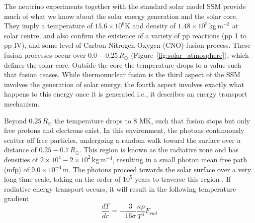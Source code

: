 The neutrino experiments together with the standard solar model SSM provide much of what we know about the solar energy generation and the solar core. They imply a temperature of $15.6\times10^6$K and density of $1.48\times10^5$\,kg\,m$^{-3}$ at solar centre, and also confirm the existence of a variety of pp reactions (pp 1 to pp IV), and some level of Carbon-Nitrogen-Oxygen (CNO) fusion process. These fusion processes occur over $0.0-0.25\,R_{\odot}$ (Figure~\ref{fig:solar_atmosphere}), which defines the solar core. Outside the core the temperature drops to a value such that fusion ceases. While thermonuclear fusion is the third aspect of the SSM involves the generation of solar energy, the fourth aspect involves exactly what happens to this energy once it is generated i.e., it describes an energy transport mechanism.


Beyond $0.25\,R_{\odot}$ the temperature drops to 8 MK, such that fusion stops but only free protons and electrons exist. In this environment, the photons continuously scatter off free particles, undergoing a random walk toward the surface over a distance of $0.25-0.7\,R_{\odot}$. This region is known as the radiative zone and has densities of $2\times10^4-2\times10^2$\,kg\,m$^{-3}$, resulting in a small photon mean free path (mfp) of $9.0\times10^{-4}$\,m. The photons proceed towards the solar surface over a very long time scale, taking on the order of $10^{5}$ years to traverse this region \citep{mitalas1992}. If radiative energy transport occurs, it will result in the following temperature gradient
\begin{equation}
\frac{dT}{dr} = -\frac{3}{16 \sigma}\frac{\kappa \rho}{T^3}F_{rad}
\end{equation}



